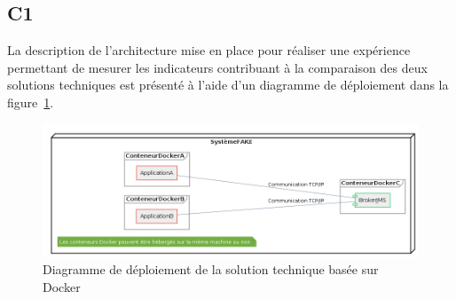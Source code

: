 \subsection*{C1}
    La description de l'architecture mise en place pour réaliser une expérience permettant de mesurer les indicateurs contribuant à la comparaison des deux solutions techniques est présenté à l'aide d'un diagramme de déploiement dans la figure~\ref{fig:deploiement-docker}.

    \begin{figure}[H]
        \centering
        \includegraphics[width=\textwidth]{images/C1.png}
        \caption{Diagramme de déploiement de la solution technique basée sur Docker}
        \label{fig:deploiement-docker}
    \end{figure}
